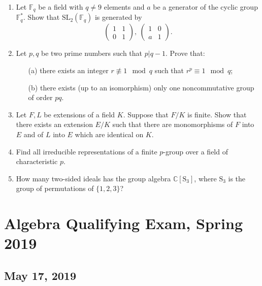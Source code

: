 \documentclass{article}
\begin{document}
\begin{enumerate}
    \item Let \(\mathbb{F}_{q}\) be a field with \(q\neq 9\) elements and \(a\) be a generator of the cyclic group \(\mathbb{F}^{*}_{q}\). Show that \(\mathrm{SL}_{2}(\mathbb{F}_{q})\) is generated by
    \[\left(\begin{array}{cc}1&1\\0&1\end{array}\right),\ \left(\begin{array}{cc}1&0\\a&1\end{array}\right).\]

    \item Let \(p,q\) be two prime numbers such that \(p|q-1\). Prove that:
    \begin{itemize}
        \item[(a)] there exists an integer \(r\not\equiv 1\mod q\) such that \(r^{p}\equiv 1\mod q\);
        \item[(b)] there exists (up to an isomorphism) only one noncommutative group of order \(pq\).
    \end{itemize}

    \item Let \(F,L\) be extensions of a field \(K\). Suppose that \(F/K\) is finite. Show that there exists an extension \(E/K\) such that there are monomorphisms of \(F\) into \(E\) and of \(L\) into \(E\) which are identical on \(K\).

    \item Find all irreducible representations of a finite \(p\)-group over a field of characteristic \(p\).

    \item How many two-sided ideals has the group algebra \(\mathbb{C}[\mathrm{S}_{3}]\), where \(\mathrm{S}_{3}\) is the group of permutations of \(\{1,2,3\}\)?
\end{enumerate}

\section*{Algebra Qualifying Exam, Spring 2019}
\subsection*{May 17, 2019}
\end{document}
